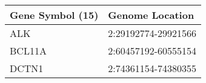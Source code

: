 \begin{tabular}{ll}
\toprule
Gene Symbol (15) &     Genome Location \\
\midrule
             ALK & 2:29192774-29921566 \\
          BCL11A & 2:60457192-60555154 \\
           DCTN1 & 2:74361154-74380355 \\
\bottomrule
\end{tabular}
